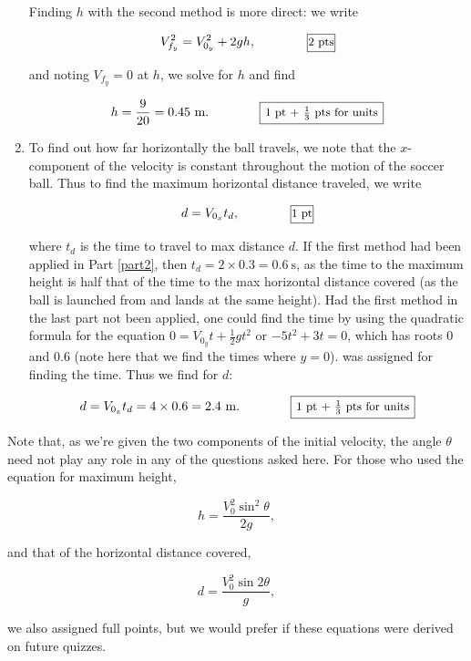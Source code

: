 \documentclass{article}[12pt]
\begin{document}
\begin{large}
\begin{enumerate}
Finding $h$ with the second method is more direct: we write 

$$ V_{f_y}^2 = V_{0_y}^2 + 2gh, \qquad \qquad \begin{small} \framebox[1.1\width]{2 pts} \end{small}$$

and noting $V_{f_y} = 0$ at $h$, we solve for $h$ and find

$$ h = \frac{9}{20} = 0.45 \ \text{m}. \qquad \qquad \begin{small} \framebox[1.1\width]{1 pt + $\frac{1}{3}$ pts for units} \end{small} $$ 

\item To find out how far horizontally the ball travels, we note that the $x$-component of the velocity is constant throughout the motion of the soccer ball. 
Thus to find the maximum horizontal distance traveled, we write 

$$ d = V_{0_x} t_d, \qquad \qquad \begin{small} \framebox[1.1\width]{1 pt} \end{small}$$

where $t_d$ is the time to travel to max distance $d$. If the first method had been applied in Part \ref{part2}, then $t_d = 2 \times 0.3 = 0.6 \ \text{s}$, as 
the time to the maximum height is half that of the time to the max horizontal distance covered
(as the ball is launched from and lands at the same height). Had the first method
in the last part not been applied, one could find the time by using the quadratic formula for the equation $0 = V_{0_y} t + \frac{1}{2}gt^2$ or
$-5t^2 + 3t = 0$, which has roots 0 and 0.6 (note here that we find the times where $y=0$). 
 was assigned for finding the time. Thus we find for $d$:

$$d = V_{0_x} t_d = 4 \times 0.6 = 2.4 \ \text{m}. \qquad \qquad \begin{small} \framebox[1.1\width]{1 pt + $\frac{1}{3}$ pts for units} \end{small}$$

\end{enumerate}

\noindent Note that, as we're given the two components of the initial velocity, the angle $\theta$ need not play any role in any of the questions asked here. 
For those who used the equation for maximum height, 

$$ h = \frac{V_0^2 \sin^2 \theta}{2g},$$

and that of the horizontal distance covered, 

$$ d = \frac{V_0^2 \sin 2\theta}{g},$$

we also assigned full points, but we would prefer if these equations were derived on future quizzes. 
 
\end{large}
 
 
 
 
 
 
 
 
\end{document}
